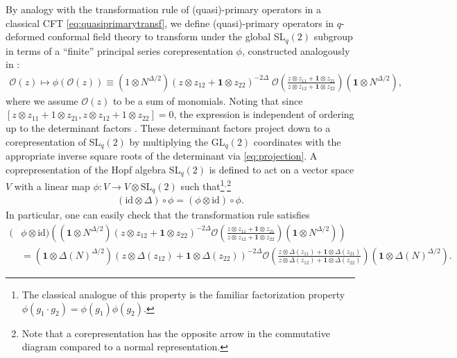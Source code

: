 \documentclass[a4paper,titlepage,12pt]{article}
\numberwithin{equation}{section}
\begin{document}
By analogy with the transformation rule of (quasi)-primary operators in a classical CFT \eqref{eq:quasiprimarytransf}, we define (quasi)-primary operators in $q$-deformed conformal field theory to transform under the global SL$_q(2)$ subgroup in terms of a ``finite'' principal series corepresentation $\phi$, constructed analogously in \cite{Belaey:2025ijg}:  
\begin{align}
\label{eq:qprimary}
 \mathcal{O}(z) \mapsto \phi(\mathcal{O}(z)) \equiv  (1\otimes N^{\Delta/2}) \left( z\otimes z_{12} + \mathbf{1}\otimes z_{22} \right)^{-2\Delta} \;\mathcal{O}\left( \frac{z\otimes z_{11} + \mathbf{1}\otimes z_{21}}{ z\otimes z_{12} +\mathbf{1}\otimes z_{22}}\right) (\mathbf{1}\otimes N^{\Delta/2}),
\end{align} 
where we assume $\mathcal{O}(z)$ to be a sum of monomials. Noting that since $[z\otimes z_{11} + 1\otimes z_{21}, z\otimes z_{12} + 1\otimes z_{22}] = 0$, the expression is independent of ordering up to the determinant factors \cite{Ip:2013}. These determinant factors project down to a corepresentation of SL$_q(2)$ by multiplying the GL$_q(2)$ coordinates with the appropriate inverse square roots of the determinant via \eqref{eq:projection}.  A coprepresentation of the Hopf algebra SL$_q(2)$ is defined to act on a vector space $V$ with a linear map $\phi:V \to V\otimes \text{SL}_q(2)$ such that\footnote{The classical analogue of this property is the familiar factorization property $\phi(g_1\cdot g_2)=\phi(g_1)\phi(g_2).$}$^{,}$\footnote{Note that a corepresentation has the opposite arrow in the commutative diagram compared to a normal representation.} 
\begin{align}
    (\text{id} \otimes \Delta) \circ \phi =(\phi \otimes \text{id}) \circ \phi.
\end{align}
In particular, one can easily check that the transformation rule satisfies \begin{align}
     (&\phi \otimes \text{id})\left( (\mathbf{1}\otimes N^{\Delta/2}) \left( z\otimes z_{12} + \mathbf{1}\otimes z_{22} \right)^{-2\Delta} \mathcal{O}\left( \frac{z\otimes z_{11} +\mathbf{1}\otimes z_{21}}{ z\otimes z_{12} + \mathbf{1}\otimes z_{22}}\right) (\mathbf{1}\otimes N^{\Delta/2})\right)  \\
     &=  (\mathbf{1}\otimes \Delta(N)^{\Delta/2}) (z\otimes \Delta(z_{12}) + \mathbf{1}\otimes \Delta(z_{22}))^{-2\Delta}\mathcal{O}\left( \frac{z\otimes \Delta(z_{11}) + \mathbf{1}\otimes\Delta(z_{21})}{z\otimes \Delta(z_{12}) + \mathbf{1}\otimes\Delta(z_{22})} \right) (\mathbf{1}\otimes \Delta(N)^{\Delta/2}).\nonumber
\end{align}
\end{document}
